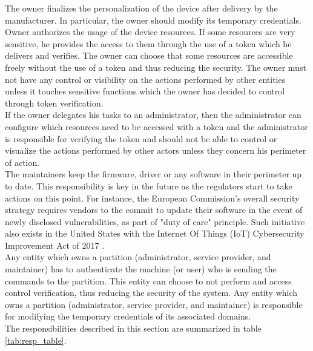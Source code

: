 \documentclass[conference]{IEEEtran}
\begin{document}
The owner finalizes the personalization of the device after delivery by the manufacturer. In particular, the owner should modify its temporary credentials. Owner authorizes the usage of the device resources. If some resources are very sensitive, he provides the access to them through the use of a token which he delivers and verifies. The owner can choose that some resources are accessible freely without the use of a token and thus reducing the security. The owner must not have any control or visibility on the actions performed by other entities unless it touches sensitive functions which the owner has decided to control through token verification.\\

If the owner delegates his tasks to an administrator, then the administrator can configure which resources need to be accessed with a token and the administrator is responsible for verifying the token and should not be able to control or visualize the actions performed by other actors unless they concern his perimeter of action.\\

The maintainers keep the firmware, driver or any software in their perimeter up to date. This responsibility is key in the future as the regulators start to take actions on this point. For instance, the European Commission's overall security strategy \cite{enisa_iot_2017} requires vendors to the commit to update their software in the event of newly disclosed vulnerabilities, as part of "duty of care" principle. Such initiative also exists in the United States with the Internet Of Things (IoT) Cybersecurity Improvement Act of 2017 \cite{IOTAct_2017}.\\

Any entity which owns a partition (administrator, service provider, and maintainer) has to authenticate the machine (or user) who is sending the commands to the partition. This entity can choose to not perform and access control verification, thus reducing the security of the system. Any entity which owns a partition (administrator, service provider, and maintainer) is responsible for modifying the temporary credentials of its associated domains.\\

The responsibilities described in this section are summarized in table \ref{tab:resp_table}.\\
\end{document}
